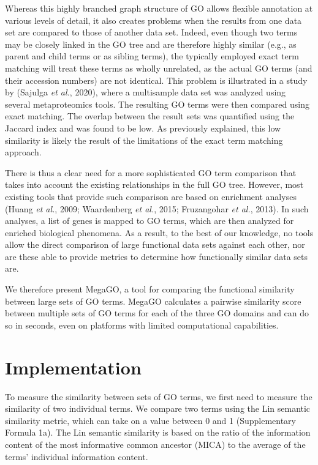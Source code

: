 Whereas this highly branched graph structure of GO allows flexible
annotation at various levels of detail, it also creates problems when
the results from one data set are compared to those of another data set.
Indeed, even though two terms may be closely linked in the GO tree and
are therefore highly similar (e.g., as parent and child terms or as
sibling terms), the typically employed exact term matching will treat
these terms as wholly unrelated, as the actual GO terms (and their
accession numbers) are not identical. This problem is illustrated in a
study by (Sajulga \emph{et al.}, 2020), where a multisample data set was
analyzed using several metaproteomics tools. The resulting GO terms were
then compared using exact matching. The overlap between the result sets
was quantified using the Jaccard index and was found to be low. As
previously explained, this low similarity is likely the result of the
limitations of the exact term matching approach.

There is thus a clear need for a more sophisticated GO term comparison
that takes into account the existing relationships in the full GO tree.
However, most existing tools that provide such comparison are based on
enrichment analyses (Huang \emph{et al.}, 2009; Waardenberg \emph{et
al.}, 2015; Fruzangohar \emph{et al.}, 2013). In such analyses, a list
of genes is mapped to GO terms, which are then analyzed for enriched
biological phenomena. As a result, to the best of our knowledge, no
tools allow the direct comparison of large functional data sets against
each other, nor are these able to provide metrics to determine how
functionally similar data sets are.

We therefore present MegaGO, a tool for comparing the functional
similarity between large sets of GO terms. MegaGO calculates a pairwise
similarity score between multiple sets of GO terms for each of the three
GO domains and can do so in seconds, even on platforms with limited
computational capabilities.

\hypertarget{implementation-1}{%
\section{Implementation}\label{implementation-1}}

To measure the similarity between sets of GO terms, we first need to
measure the similarity of two individual terms. We compare two terms
using the Lin semantic similarity metric, which can take on a value
between 0 and 1 (Supplementary Formula 1a). The Lin semantic similarity
is based on the ratio of the information content of the most informative
common ancestor (MICA) to the average of the terms' individual
information content.

